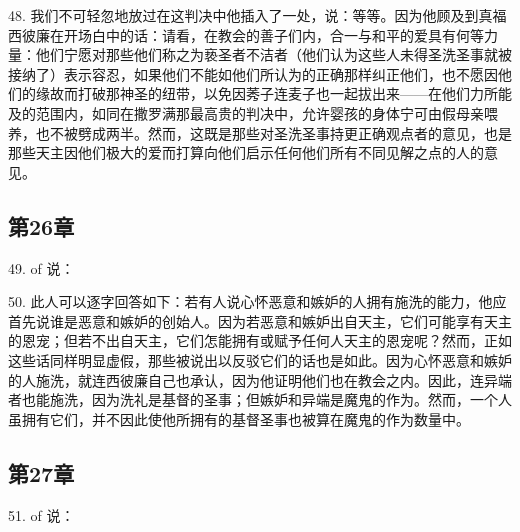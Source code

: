 48. 我们不可轻忽地放过在这判决中他插入了一处，说：等等。因为他顾及到真福西彼廉在开场白中的话：请看，在教会的善子们内，合一与和平的爱具有何等力量：他们宁愿对那些他们称之为亵圣者不洁者（他们认为这些人未得圣洗圣事就被接纳了）表示容忍，如果他们不能如他们所认为的正确那样纠正他们，也不愿因他们的缘故而打破那神圣的纽带，以免因莠子连麦子也一起拔出来——在他们力所能及的范围内，如同在撒罗满那最高贵的判决中，允许婴孩的身体宁可由假母亲喂养，也不被劈成两半。然而，这既是那些对圣洗圣事持更正确观点者的意见，也是那些天主因他们极大的爱而打算向他们启示任何他们所有不同见解之点的人的意见。\par


\subsection{第26章}

49.  of 说：\par

50. 此人可以逐字回答如下：若有人说心怀恶意和嫉妒的人拥有施洗的能力，他应首先说谁是恶意和嫉妒的创始人。因为若恶意和嫉妒出自天主，它们可能享有天主的恩宠；但若不出自天主，它们怎能拥有或赋予任何人天主的恩宠呢？然而，正如这些话同样明显虚假，那些被说出以反驳它们的话也是如此。因为心怀恶意和嫉妒的人施洗，就连西彼廉自己也承认，因为他证明他们也在教会之内。因此，连异端者也能施洗，因为洗礼是基督的圣事；但嫉妒和异端是魔鬼的作为。然而，一个人虽拥有它们，并不因此使他所拥有的基督圣事也被算在魔鬼的作为数量中。\par


\subsection{第27章}

51.  of 说：\par

